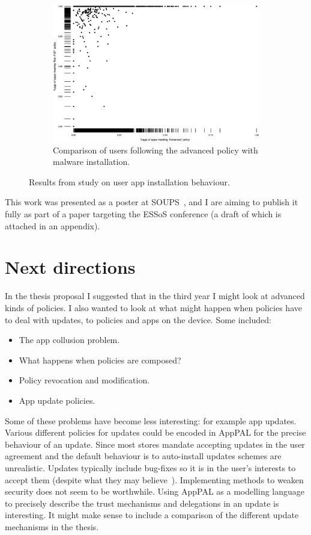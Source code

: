 \documentclass[a4paper]{scrartcl}
\begin{document}
\begin{figure}
  \begin{subfigure}[b]{\linewidth}
    \includegraphics[width=\linewidth]{./images/compare-2yr.eps}
    \caption{Comparison of users following the advanced policy with malware installation.}
    \label{sfig:compare}
  \end{subfigure}

  \caption{Results from study on user app installation behaviour.}
  \label{fig:lin}
\end{figure}

This work was presented as a poster at SOUPS~\citep{Hallett:2015ty}, and I are aiming to publish it fully as part of a paper targeting the ESSoS conference (a draft of which is attached in an appendix).

\section{Next directions}

In the thesis proposal I suggested that in the third year I might look at advanced kinds of policies.
I also wanted to look at what might happen when policies have to deal with updates, to policies and apps on the device.
Some included:
\begin{itemize}
  \item The app collusion problem.
  \item What happens when policies are composed?
  \item Policy revocation and modification.
  \item App update policies.
\end{itemize}

Some of these problems have become less interesting: for example app updates.
Various different policies for updates could be encoded in AppPAL for the precise behaviour of an update.
Since most stores mandate accepting updates in the user agreement and the default behaviour is to auto-install updates schemes are unrealistic.
Updates typically include bug-fixes so it is in the user's interests to accept them (despite what they may believe~\citep{Vaniea:2014fk}).
Implementing methods to weaken security does not seem to be worthwhile.
Using AppPAL as a modelling language to precisely describe the trust mechanisms and delegations in an update is interesting.
It might make sense to include a comparison of the different update mechanisms in the thesis.
\end{document}
